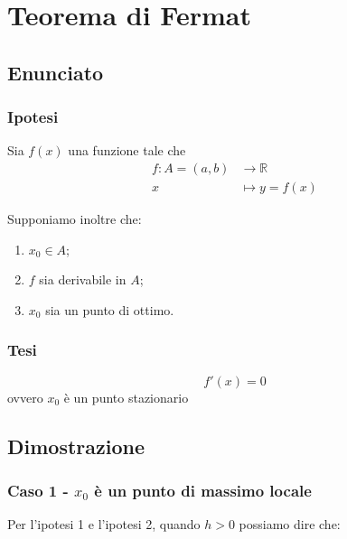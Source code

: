 \documentclass[../dimostrazioni]{subfiles}
\begin{document}
    \chapter{Teorema di Fermat}

        \section*{Enunciato}

        \subsection*{Ipotesi}

            Sia \(f(x)\) una funzione tale che
            \begin{align*}
                f : A = (a, b) &\longrightarrow \mathbb{R}\\
                x &\longmapsto y = f(x) 
            \end{align*}

            Supponiamo inoltre che:

            \begin{enumerate}
                \indentitem \item \(x_0 \in A\);
                \indentitem \item \(f\) sia derivabile in \(A\);
                \indentitem \item \(x_0\) sia un punto di ottimo.
            \end{enumerate}

        \subsection*{Tesi}

            \[f'(x) = 0\] ovvero \(x_0\) è un punto stazionario

        \section*{Dimostrazione}

            \medskip

            \subsection{Caso 1 - \(x_0\) è un punto di massimo locale}

            Per l'ipotesi 1 e l'ipotesi 2, quando \(h>0\) possiamo dire che:
            
\end{document}
